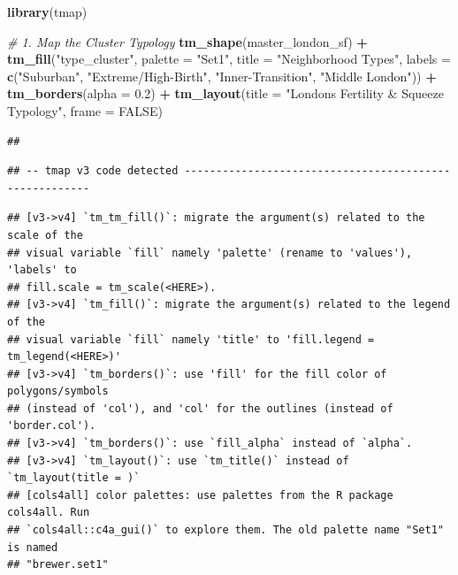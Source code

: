 \documentclass[
]{article}
\newenvironment{Shaded}{\begin{snugshade}}{\end{snugshade}}
\newcommand{\AttributeTok}[1]{\textcolor[rgb]{0.13,0.29,0.53}{#1}}
\newcommand{\CommentTok}[1]{\textcolor[rgb]{0.56,0.35,0.01}{\textit{#1}}}
\newcommand{\ConstantTok}[1]{\textcolor[rgb]{0.56,0.35,0.01}{#1}}
\newcommand{\FloatTok}[1]{\textcolor[rgb]{0.00,0.00,0.81}{#1}}
\newcommand{\FunctionTok}[1]{\textcolor[rgb]{0.13,0.29,0.53}{\textbf{#1}}}
\newcommand{\NormalTok}[1]{#1}
\newcommand{\SpecialCharTok}[1]{\textcolor[rgb]{0.81,0.36,0.00}{\textbf{#1}}}
\newcommand{\StringTok}[1]{\textcolor[rgb]{0.31,0.60,0.02}{#1}}
\begin{document}
\begin{Shaded}
\begin{Highlighting}[]
\FunctionTok{library}\NormalTok{(tmap)}

\CommentTok{\# 1. Map the Cluster Typology}
\FunctionTok{tm\_shape}\NormalTok{(master\_london\_sf) }\SpecialCharTok{+}
  \FunctionTok{tm\_fill}\NormalTok{(}\StringTok{"type\_cluster"}\NormalTok{, }
          \AttributeTok{palette =} \StringTok{"Set1"}\NormalTok{, }
          \AttributeTok{title =} \StringTok{"Neighborhood Types"}\NormalTok{,}
          \AttributeTok{labels =} \FunctionTok{c}\NormalTok{(}\StringTok{"Suburban"}\NormalTok{, }\StringTok{"Extreme/High{-}Birth"}\NormalTok{, }\StringTok{"Inner{-}Transition"}\NormalTok{, }\StringTok{"Middle London"}\NormalTok{)) }\SpecialCharTok{+}
  \FunctionTok{tm\_borders}\NormalTok{(}\AttributeTok{alpha =} \FloatTok{0.2}\NormalTok{) }\SpecialCharTok{+}
  \FunctionTok{tm\_layout}\NormalTok{(}\AttributeTok{title =} \StringTok{"London\textquotesingle{}s Fertility \& Squeeze Typology"}\NormalTok{, }\AttributeTok{frame =} \ConstantTok{FALSE}\NormalTok{)}
\end{Highlighting}
\end{Shaded}

\begin{verbatim}
## 
\end{verbatim}

\begin{verbatim}
## -- tmap v3 code detected -------------------------------------------------------
\end{verbatim}

\begin{verbatim}
## [v3->v4] `tm_tm_fill()`: migrate the argument(s) related to the scale of the
## visual variable `fill` namely 'palette' (rename to 'values'), 'labels' to
## fill.scale = tm_scale(<HERE>).
## [v3->v4] `tm_fill()`: migrate the argument(s) related to the legend of the
## visual variable `fill` namely 'title' to 'fill.legend = tm_legend(<HERE>)'
## [v3->v4] `tm_borders()`: use 'fill' for the fill color of polygons/symbols
## (instead of 'col'), and 'col' for the outlines (instead of 'border.col').
## [v3->v4] `tm_borders()`: use `fill_alpha` instead of `alpha`.
## [v3->v4] `tm_layout()`: use `tm_title()` instead of `tm_layout(title = )`
## [cols4all] color palettes: use palettes from the R package cols4all. Run
## `cols4all::c4a_gui()` to explore them. The old palette name "Set1" is named
## "brewer.set1"
\end{verbatim}
\end{document}
